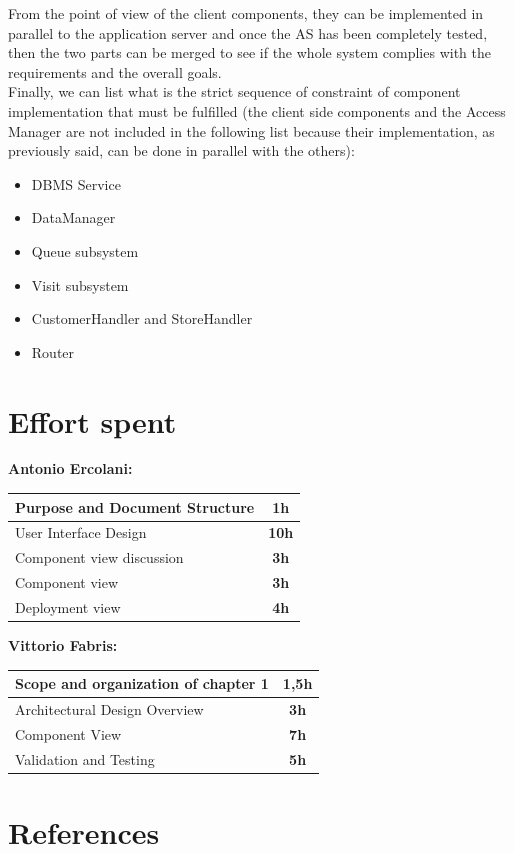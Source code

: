 \documentclass[]{article}
\begin{document}
From the point of view of the client components, they can be implemented in parallel to the application server and once the AS has been completely tested, then the two parts can be merged to see if the whole system complies with the requirements and the overall goals.\\ \newline
Finally, we can list what is the strict sequence of constraint of component implementation that must be fulfilled (the client side components and the Access Manager are not included in the following list because their implementation, as previously said, can be done in parallel with the others): 
				\begin{itemize}
					\item DBMS Service
					\item DataManager
					\item Queue subsystem
					\item Visit subsystem
					\item CustomerHandler and StoreHandler
					\item Router
				\end{itemize} 

			 
		\section{Effort spent}
			
			\medskip
			\textbf{\large Antonio Ercolani:} \\ \newline
			\begin{tabular}{|l|c|}
				\hline
				Purpose and Document Structure &  \textbf{1h} \\ \hline
				\rowcolor[HTML]{DCDCDC} 
				User Interface Design & \textbf{10h} \\ \hline
				Component view discussion & \textbf{3h} \\ \hline
				\rowcolor[HTML]{DCDCDC} 
				Component view & \textbf{3h} \\ \hline
				Deployment view & \textbf{4h} \\ \hline
				
			\end{tabular}
			\newline
			\newline
			
			\medskip
			\textbf{\large Vittorio Fabris:} \\ \newline
			\begin{tabular}{|l|c|}
				\hline
				Scope and organization of chapter 1&  \textbf{1,5h} \\ \hline
				\rowcolor[HTML]{DCDCDC} 
				 Architectural Design Overview & \textbf{3h} \\ \hline
				 Component View & \textbf{7h} \\ \hline
				\rowcolor[HTML]{DCDCDC} 
				Validation and Testing & \textbf{5h} \\ \hline
			\end{tabular}
	
			
			\section{References}	
			
			
	

				
\end{document}
